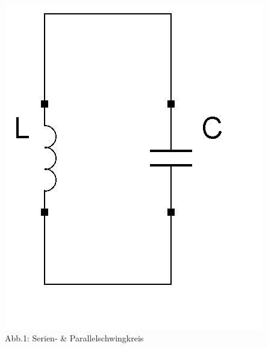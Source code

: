 \begin{frame}
\begin{center}
		\includegraphics[scale=0.4]{a04/Schwingkreis_parallel.png}\\
		Abb.1: Serien- \& Parallelschwingkreis
	\end{center}
\end{frame}

